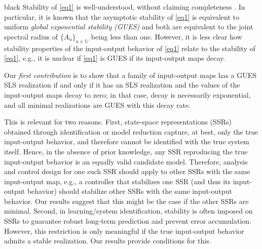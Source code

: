 \documentclass[journal,twoside,web]{ieeecolor}
\begin{document}
  \begin{color}{black}
   Stability of \eqref{eq1} is well-understood, without claiming completeness \cite{Chitour1,RJungers,IanMorris2022,Protasov2022,mason2023}. In particular, it is known that the asymptotic stability of \eqref{eq1} is equivalent to uniform \emph{global exponential stability (GUES)} and both are equivalent to the joint spectral radius of $\{A_u\}_{u \in \mathbb{U}}$ being less than one. 
   However, it is less clear how stability properties of the input-output behavior of \eqref{eq1} relate to the stability of \eqref{eq1}, e.g., it is unclear if
   \eqref{eq1} is GUES if its input-output maps decay.
   
  Our \emph{first contribution} is to show that a family of input-output maps has a GUES SLS realization if and only if it has an SLS realization and the values of the input-output maps decay to zero; in that case, decay is necessarily
  exponential, and all minimal realizations are GUES with this decay rate.

  This is relevant for two reasons. 
  First, state-space representations (SSRs) obtained through identification or model reduction capture, at best, only the true input-output behavior, 
  and therefore cannot be identified with the true system itself. 
  Hence, in the absence of prior knowledge, any SSR reproducing the true input-output behavior is an equally valid candidate model.
  Therefore, analysis and control design for one such SSR should apply to 
  other SSRs with the same input-output map, e.g.,
  a controller that stabilizes one SSR (and thus its input-output behavior) should stabilize other SSRs with the same input-output behavior. 
  Our results suggest that this might be the case if the other SSRs are minimal.
  Second, in learning/system identification, stability is often imposed on SSRs to guarantee robust long-term prediction and prevent error accumulation. However, this restriction is only meaningful if the true input-output behavior admits a stable realization. Our results provide conditions for this.


\end{color}
\end{document}
